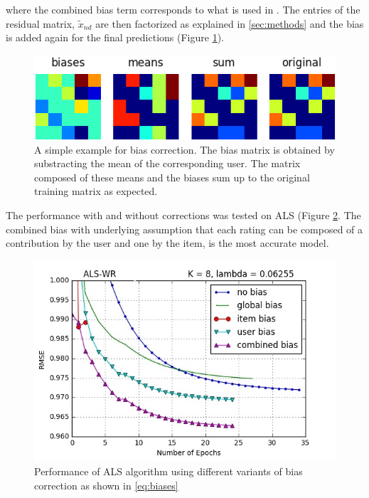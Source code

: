 where the combined bias term corresponds to what is used in \cite{Koren2009}. 
The entries of the residual matrix, $\widetilde{x}_{nd}$ are then factorized as explained
in \ref{sec:methods} and the bias is added again for the final predictions
(Figure \ref{fig:biasmatrix}).

\begin{figure}[htbp]
  \centering
  \includegraphics[width=.7\columnwidth]{figures/biases_user.png}
  \caption{A simple example for bias correction. The bias matrix is obtained by
  substracting the mean of the corresponding user. The matrix composed of these
  means and the biases sum up to the original training matrix as expected.}
  \label{fig:biasmatrix}
\end{figure}

The performance with and without corrections was tested on ALS (Figure
\ref{fig:bias}. 
The combined bias with underlying assumption that each rating can
be composed of a contribution by the user and one by the item, is the most
accurate model. 

\begin{figure}[htbp]
  \centering
  \includegraphics[width=.7\columnwidth]{figures/bias.jpg}
  \vspace{-3mm}
  \caption{Performance of ALS algorithm using different variants of bias
  correction as shown in \eqref{eq:biases}}
  \label{fig:bias}
\end{figure}
